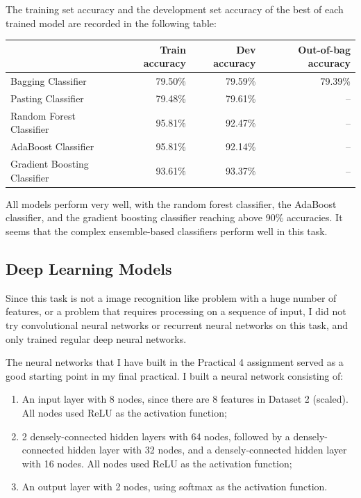 \documentclass[12pt,twoside,a4paper]{article}
\begin{document}
The training set accuracy and the development set accuracy of the best of each trained model are recorded in the following table:

\begin{center}
\begin{tabular}{lrrr}
\toprule
{} & Train accuracy & Dev accuracy & Out-of-bag accuracy \\ 
\midrule
Bagging Classifier & 79.50\% & 79.59\% & 79.39\% \\
Pasting Classifier & 79.48\% & 79.61\% & -- \\
Random Forest Classifier & 95.81\% & 92.47\% & -- \\
AdaBoost Classifier & 95.81\% & 92.14\% & -- \\
Gradient Boosting Classifier & 93.61\% & 93.37\% & -- \\
\bottomrule
\end{tabular} 
\end{center}

All models perform very well, with the random forest classifier, the AdaBoost classifier, and the gradient boosting classifier reaching above 90\% accuracies. It seems that the complex ensemble-based classifiers perform well in this task.

\subsection{Deep Learning Models}

Since this task is not a image recognition like problem with a huge number of features, or a problem that requires processing on a sequence of input, I did not try convolutional neural networks or recurrent neural networks on this task, and only trained regular deep neural networks. 

The neural networks that I have built in the Practical 4 assignment served as a good starting point in my final practical. I built a neural network consisting of:

\begin{enumerate}
    \item An input layer with 8 nodes, since there are 8 features in Dataset 2 (scaled). All nodes used ReLU as the activation function;
    \item 2 densely-connected hidden layers with 64 nodes, followed by a densely-connected hidden layer with 32 nodes, and a densely-connected hidden layer with 16 nodes. All nodes used ReLU as the activation function;
    \item An output layer with 2 nodes, using softmax as the activation function.
\end{enumerate}
\end{document}
